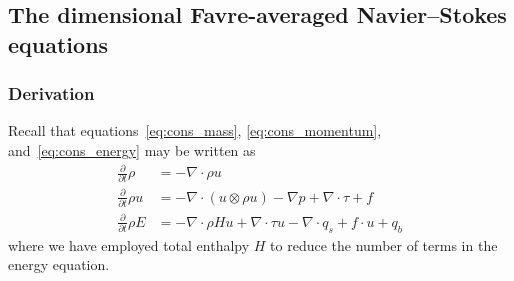 \documentclass[letterpaper,11pt,nointlimits,reqno,draft]{amsart}
\begin{document}
\subsection{The dimensional Favre-averaged Navier--Stokes equations}

\subsubsection{Derivation}

Recall that equations~\eqref{eq:cons_mass}, \eqref{eq:cons_momentum},
and~\eqref{eq:cons_energy} may be written as
\begin{align}
    \frac{\partial}{\partial{}t}\rho
&=
  - \nabla\cdot\rho{}u
\\
    \frac{\partial{}}{\partial{}t}\rho{}u
&=
  - \nabla\cdot(u\otimes{}\rho{}u)
  - \nabla{}p + \nabla\cdot{}\tau + f
\\
    \frac{\partial}{\partial{}t} \rho{}E
&=
  - \nabla\cdot{}\rho{}Hu
  + \nabla\cdot{}\tau{}u
  - \nabla\cdot{}q_{s}
  + f\cdot{}u
  + q_b
\end{align}
where we have employed total enthalpy $H$ to reduce the number of terms in the
energy equation.
\end{document}
